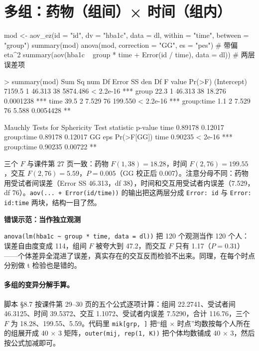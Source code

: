 \section{多组：药物（组间）× 时间（组内）}
\begin{rcode}[R · aov\_ez 多组]
mod <- aov_ez(id = "id", dv = "hba1c", data = dl, within = "time", between = "group")
summary(mod)
anova(mod, correction = "GG", es = "pes")                       # 带偏 eta^2
summary(aov(hba1c ~ group * time + Error(id / time), data = dl))  # 两层误差项
\end{rcode}
\begin{routput}
> summary(mod)
            Sum Sq num Df Error SS den Df  F value    Pr(>F)
(Intercept) 7159.5      1   46.313     38 5874.486 < 2.2e-16 ***
group         22.3      1   46.313     38   18.276 0.0001238 ***
time          39.5      2    7.529     76  199.550 < 2.2e-16 ***
group:time     1.1      2    7.529     76    5.588 0.0054428 **

Mauchly Tests for Sphericity
           Test statistic p-value
time              0.89178 0.12017
group:time        0.89178 0.12017
            GG eps Pr(>F[GG])
time       0.90235    < 2e-16 ***
group:time 0.90235    0.00722 **
\end{routput}
三个 $F$ 与课件第 27 页一致：药物 $F(1,38)=18.28$，时间 $F(2,76)=199.55$，交互 $F(2,76)=5.59$，$P=0.005$（GG 校正后 0.007）。注意分母不同：药物用受试者间误差（Error SS 46.313，df 38），时间和交互用受试者内误差（7.529，df 76）。\Verb|aov(... + Error(id/time))| 的输出把这两层分成 \Verb|Error: id| 与 \Verb|Error: id:time| 两块，结构一目了然。


\begin{studyexplain}
\textbf{错误示范：当作独立观测}


\Verb|anova(lm(hba1c ~ group * time, data = dl))| 把 120 个观测当作 120 个人：误差自由度变成 114，组间 $F$ 被夸大到 47.2，而交互 $F$ 只有 1.17（$P=0.31$）——个体差异全混进了误差，真实存在的交互反而检验不出来。同理，在每个时点分别做 t 检验也是错的。

\end{studyexplain}


\paragraph{多组的变异分解手算。}脚本 §8.7 按课件第 29–30 页的五个公式逐项计算：组间 22.2741、受试者间 46.3125、时间 39.5372、交互 1.1072、受试者内误差 7.5290，合计 116.76，三个 $F$ 为 18.28、199.55、5.59。代码里 \Verb|mik[grp, ]| 把“组 × 时点”均数按每个人所在的组展开成 40 × 3 矩阵，\Verb|outer(mij, rep(1, K))| 把个体均数铺成 40 × 3，然后按公式加减即可。


